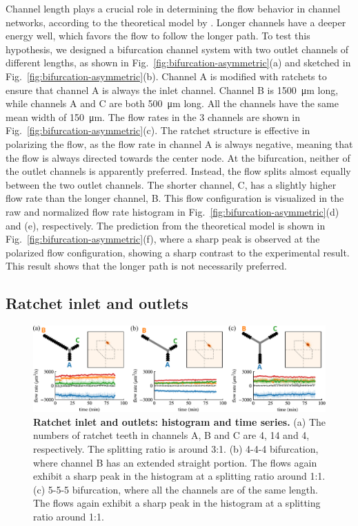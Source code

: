 \documentclass[%
10pt,
superscriptaddress,
twocolumn,
 amsmath,amssymb,
 aps,prx,
]{revtex4-2}
\begin{document}
Channel length plays a crucial role in determining the flow behavior in channel networks, according to the theoretical model by \citet{Woodhouse2017}.
Longer channels have a deeper energy well, which favors the flow to follow the longer path.
To test this hypothesis, we designed a bifurcation channel system with two outlet channels of different lengths, as shown in Fig.~\ref{fig:bifurcation-asymmetric}(a) and sketched in Fig.~\ref{fig:bifurcation-asymmetric}(b).
Channel A is modified with ratchets to ensure that channel A is always the inlet channel. 
Channel B is \SI{1500}{\micro\meter} long, while channels A and C are both \SI{500}{\micro\meter} long.
All the channels have the same mean width of \SI{150}{\micro\meter}.
The flow rates in the 3 channels are shown in Fig.~\ref{fig:bifurcation-asymmetric}(c).
The ratchet structure is effective in polarizing the flow, as the flow rate in channel A is always negative, meaning that the flow is always directed towards the center node. 
At the bifurcation, neither of the outlet channels is apparently preferred.
Instead, the flow splits almost equally between the two outlet channels.
The shorter channel, C, has a slightly higher flow rate than the longer channel, B.
This flow configuration is visualized in the raw and normalized flow rate histogram in Fig.~\ref{fig:bifurcation-asymmetric}(d) and (e), respectively.
The prediction from the theoretical model is shown in Fig.~\ref{fig:bifurcation-asymmetric}(f), where a sharp peak is observed at the polarized flow configuration, showing a sharp contrast to the experimental result. 
This result shows that the longer path is not necessarily preferred.

\subsection{Ratchet inlet and outlets}

\begin{figure}[t]
    \includegraphics[width=\textwidth]{bifurcation-ratchet.pdf}
    \caption{
    \textbf{Ratchet inlet and outlets: histogram and time series.}
    (a) The numbers of ratchet teeth in channels A, B and C are 4, 14 and 4, respectively. 
    The splitting ratio is around 3:1.
    (b) 4-4-4 bifurcation, where channel B has an extended straight portion. 
    The flows again exhibit a sharp peak in the histogram at a splitting ratio around 1:1.
    (c) 5-5-5 bifurcation, where all the channels are of the same length. 
    The flows again exhibit a sharp peak in the histogram at a splitting ratio around 1:1.
    }
    \label{fig:bifurcation-ratchet}
\end{figure}
\end{document}
